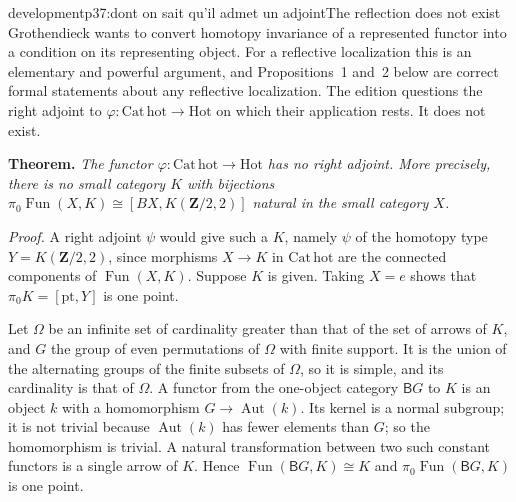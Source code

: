 \begin{dcomment}{development}{p37:dont on sait qu'il admet un adjoint}{The reflection does not exist}
Grothendieck wants to convert homotopy invariance of a represented functor into a condition on its representing object. For a reflective localization this is an elementary and powerful argument, and Propositions~1 and~2 below are correct formal statements about any reflective localization. The edition questions the right adjoint to $\varphi:\mathrm{Cat}\,\mathrm{hot}\to\mathrm{Hot}$ on which their application rests. It does not exist.

\textbf{Theorem.}\ours
\textit{The functor $\varphi:\mathrm{Cat}\,\mathrm{hot}\to\mathrm{Hot}$ has no right adjoint. More precisely, there is no small category $K$ with bijections $\pi_0\operatorname{Fun}(X,K)\cong[BX,K(\mathbf Z/2,2)]$ natural in the small category $X$.}

\textit{Proof.}
A right adjoint $\psi$ would give such a $K$, namely $\psi$ of the homotopy type $Y=K(\mathbf Z/2,2)$, since morphisms $X\to K$ in $\mathrm{Cat}\,\mathrm{hot}$ are the connected components of $\operatorname{Fun}(X,K)$. Suppose $K$ is given. Taking $X=e$ shows that $\pi_0K=[\mathrm{pt},Y]$ is one point.

Let $\Omega$ be an infinite set of cardinality greater than that of the set of arrows of $K$, and $G$ the group of even permutations of $\Omega$ with finite support. It is the union of the alternating groups of the finite subsets of $\Omega$, so it is simple, and its cardinality is that of $\Omega$. A functor from the one-object category $\mathsf BG$ to $K$ is an object $k$ with a homomorphism $G\to\operatorname{Aut}(k)$. Its kernel is a normal subgroup; it is not trivial because $\operatorname{Aut}(k)$ has fewer elements than $G$; so the homomorphism is trivial. A natural transformation between two such constant functors is a single arrow of $K$. Hence $\operatorname{Fun}(\mathsf BG,K)\cong K$ and $\pi_0\operatorname{Fun}(\mathsf BG,K)$ is one point.


\end{dcomment}
